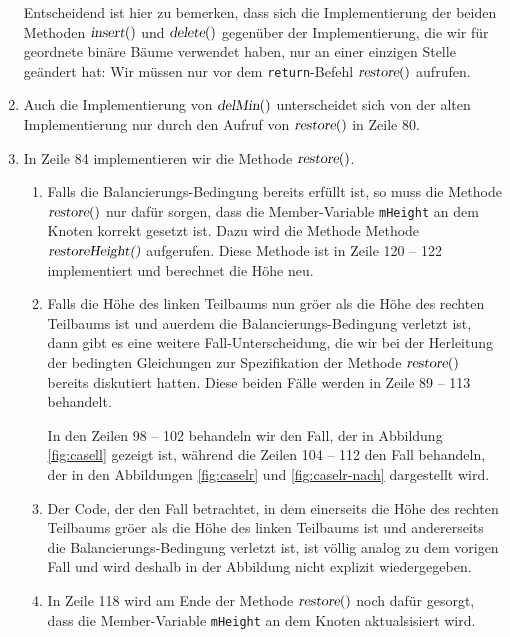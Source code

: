 \begin{enumerate}
      Entscheidend ist hier zu bemerken, dass sich die Implementierung der beiden Methoden
      $\textsl{insert}()$ und $\textsl{delete}()$  gegen\"uber der Implementierung,
      die wir f\"ur geordnete bin\"are B\"aume verwendet haben, nur an einer einzigen Stelle
      ge\"andert hat:  Wir m\"ussen nur vor dem \texttt{return}-Befehl
      $\textsl{restore}()$ aufrufen.
\item Auch die Implementierung von $\textsl{delMin}()$ unterscheidet sich von der alten
      Implementierung nur durch den Aufruf von $\textsl{restore}()$ in Zeile 80.
\item In Zeile 84 implementieren wir die Methode $\textsl{restore}()$.
      \begin{enumerate}
      \item Falls die Balancierungs-Bedingung bereits erf\"ullt ist, so muss die Methode
            $\textsl{restore}()$ nur daf\"ur sorgen, dass die Member-Variable \texttt{mHeight} an dem Knoten
            korrekt gesetzt ist.  Dazu wird die Methode Methode $\textsl{restoreHeight()}$
            aufgerufen.  Diese Methode ist in Zeile 120 -- 122 implementiert und berechnet
            die H\"ohe neu.
      \item Falls die H\"ohe des linken Teilbaums nun gr\"o\3er als die H\"ohe des rechten
            Teilbaums ist und au\3erdem die Balancierungs-Bedingung verletzt ist,
            dann gibt es eine weitere Fall-Unterscheidung, die wir bei der Herleitung
            der bedingten Gleichungen zur Spezifikation der Methode $\textsl{restore}()$
            bereits diskutiert hatten.  Diese beiden F\"alle werden in Zeile 89 -- 113
            behandelt.

            In den Zeilen 98 -- 102 behandeln wir den Fall, der in Abbildung
            \ref{fig:casell} gezeigt ist, w\"ahrend die Zeilen 104 -- 112 
            den Fall behandeln, der in den Abbildungen \ref{fig:caselr} und
            \ref{fig:caselr-nach} dargestellt wird.
      \item Der Code, der den Fall betrachtet, in dem einerseits
            die H\"ohe des rechten Teilbaums  gr\"o\3er als die H\"ohe des linken
            Teilbaums ist und andererseits die Balancierungs-Bedingung verletzt ist,
            ist v\"ollig analog zu dem vorigen Fall und wird deshalb in der Abbildung nicht
            explizit wiedergegeben.
      \item In Zeile 118 wird am Ende der Methode $\textsl{restore}()$ noch daf\"ur gesorgt,
            dass die Member-Variable \texttt{mHeight} an dem Knoten aktualsisiert wird.
      \end{enumerate}
\end{enumerate}


